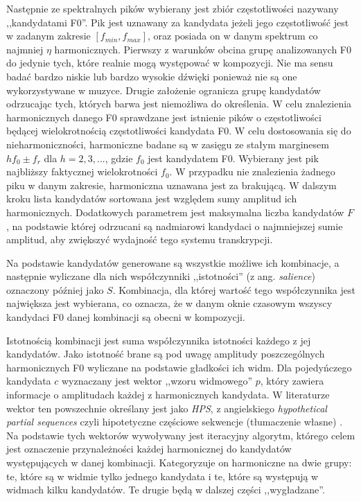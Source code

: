 \documentclass[12pt,a4paper,twoside]{mwart}
\begin{document}
Następnie ze spektralnych pików wybierany jest zbiór częstotliwości nazywany ,,kandydatami F0''. Pik jest uznawany za kandydata jeżeli jego częstotliwość jest w zadanym zakresie $[f_{min}, f_{max}]$, oraz posiada on w danym spektrum co najmniej $\eta$ harmonicznych. Pierwszy z warunków obcina grupę analizowanych F0 do jedynie tych, które realnie mogą występować w kompozycji. Nie ma sensu badać bardzo niskie lub bardzo wysokie dźwięki ponieważ nie są one wykorzystywane w muzyce. Drugie założenie ogranicza grupę kandydatów odrzucając tych, których barwa jest niemożliwa do określenia. W celu znalezienia harmonicznych danego F0 sprawdzane jest istnienie pików o częstotliwości będącej wielokrotnością częstotliwości kandydata F0. W celu dostosowania się do nieharmoniczności, harmoniczne badane są w zasięgu ze stałym marginesem $hf_0 \pm f_r$ dla $h = 2, 3, ...$, gdzie $f_0$ jest kandydatem F0. Wybierany jest pik najbliższy faktycznej wielokrotności $f_0$. W przypadku nie znalezienia żadnego piku w danym zakresie, harmoniczna uznawana jest za brakującą. W dalszym kroku lista kandydatów sortowana jest względem sumy amplitud ich harmonicznych. Dodatkowych parametrem jest maksymalna liczba kandydatów $F$, na podstawie której odrzucani są nadmiarowi kandydaci o najmniejszej sumie amplitud, aby zwiększyć wydajność tego systemu transkrypcji.

Na podstawie kandydatów generowane są wszystkie możliwe ich kombinacje, a następnie wyliczane dla nich współczynniki ,,istotności'' (z ang. \textit{salience}) oznaczony później jako $S$. Kombinacja, dla której wartość tego współczynnika jest największa jest wybierana, co oznacza, że w danym oknie czasowym wszyscy kandydaci F0 danej kombinacji są obecni w kompozycji.

Istotnością kombinacji jest suma współczynnika istotności każdego z jej kandydatów. Jako istotność brane są pod uwagę amplitudy poszczególnych harmonicznych F0 wyliczane na podstawie gładkości ich widm. Dla pojedyńczego kandydata $c$ wyznaczany jest wektor ,,wzoru widmowego'' $p$, który zawiera informacje o amplitudach każdej z harmonicznych kandydata. W literaturze wektor ten powszechnie określany jest jako \textit{HPS}, z angielskiego \textit{hypothetical partial sequences} czyli hipotetyczne częściowe sekwencje (tłumaczenie własne) \cite[3]{Transcription:Yeh:JointEvaluationF0:2}. Na podstawie tych wektorów wywoływany jest iteracyjny algorytm, którego celem jest oznaczenie przynależności każdej harmonicznej do kandydatów występujących w danej kombinacji. Kategoryzuje on harmoniczne na dwie grupy: te, które są w widmie tylko jednego kandydata i te, które są występują w widmach kilku kandydatów. Te drugie będą w dalszej części ,,wygładzane''.
\end{document}
